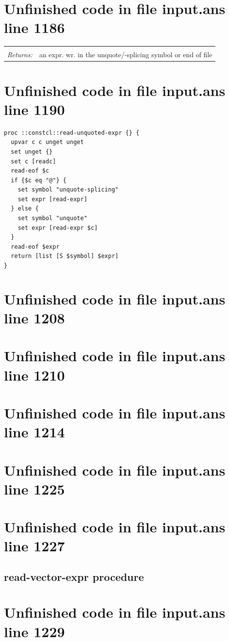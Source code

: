\documentclass[twoside,9pt]{report}
\begin{document}
\section{Unfinished code in file input.ans line 1186}
\noindent\begin{tabular}{ |p{1.9cm} p{8cm}| }
\hline
\rowcolor[HTML]{CCCCCC} \multicolumn{2}{|l|}{\bf read-unquoted-expr (internal)} \\
\textit{Returns:} & an expr. wr. in the unquote/-splicing symbol or end of file \\
\hline
\end{tabular}
\section{Unfinished code in file input.ans line 1190}
\begin{lstlisting}
proc ::constcl::read-unquoted-expr {} {
  upvar c c unget unget
  set unget {}
  set c [readc]
  read-eof $c
  if {$c eq "@"} {
    set symbol "unquote-splicing"
    set expr [read-expr]
  } else {
    set symbol "unquote"
    set expr [read-expr $c]
  }
  read-eof $expr
  return [list [S $symbol] $expr]
}
\end{lstlisting}
\section{Unfinished code in file input.ans line 1208}
\section{Unfinished code in file input.ans line 1210}
\section{Unfinished code in file input.ans line 1214}
\section{Unfinished code in file input.ans line 1225}
\section{Unfinished code in file input.ans line 1227}
\subsection{read-vector-expr procedure}
\label{read-vector-expr-procedure}
\section{Unfinished code in file input.ans line 1229}
\end{document}
